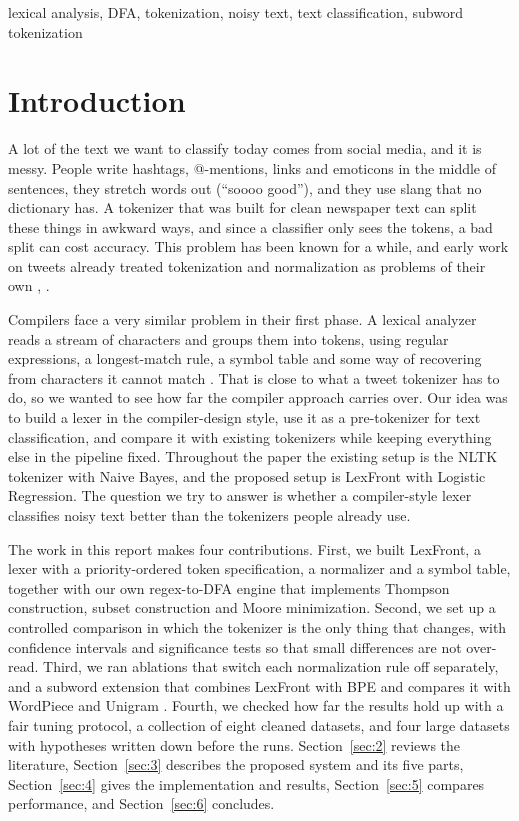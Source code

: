 \documentclass[journal,a4paper]{IEEEtran}
\begin{document}
\begin{IEEEkeywords}
lexical analysis, DFA, tokenization, noisy text, text classification, subword tokenization
\end{IEEEkeywords}

\section{Introduction}\label{sec:1}
A lot of the text we want to classify today comes from social media, and it is messy. People write hashtags, @-mentions, links and emoticons in the middle of sentences, they stretch words out (``soooo good''), and they use slang that no dictionary has. A tokenizer that was built for clean newspaper text can split these things in awkward ways, and since a classifier only sees the tokens, a bad split can cost accuracy. This problem has been known for a while, and early work on tweets already treated tokenization and normalization as problems of their own \cite{r2}, \cite{r3}.

Compilers face a very similar problem in their first phase. A lexical analyzer reads a stream of characters and groups them into tokens, using regular expressions, a longest-match rule, a symbol table and some way of recovering from characters it cannot match \cite{r1}. That is close to what a tweet tokenizer has to do, so we wanted to see how far the compiler approach carries over. Our idea was to build a lexer in the compiler-design style, use it as a pre-tokenizer for text classification, and compare it with existing tokenizers while keeping everything else in the pipeline fixed. Throughout the paper the existing setup is the NLTK tokenizer with Naive Bayes, and the proposed setup is LexFront with Logistic Regression. The question we try to answer is whether a compiler-style lexer classifies noisy text better than the tokenizers people already use.

The work in this report makes four contributions. First, we built LexFront, a lexer with a priority-ordered token specification, a normalizer and a symbol table, together with our own regex-to-DFA engine that implements Thompson construction, subset construction and Moore minimization. Second, we set up a controlled comparison in which the tokenizer is the only thing that changes, with confidence intervals and significance tests so that small differences are not over-read. Third, we ran ablations that switch each normalization rule off separately, and a subword extension that combines LexFront with BPE and compares it with WordPiece and Unigram \cite{r4}. Fourth, we checked how far the results hold up with a fair tuning protocol, a collection of eight cleaned datasets, and four large datasets with hypotheses written down before the runs. Section~\ref{sec:2} reviews the literature, Section~\ref{sec:3} describes the proposed system and its five parts, Section~\ref{sec:4} gives the implementation and results, Section~\ref{sec:5} compares performance, and Section~\ref{sec:6} concludes.
\end{document}
